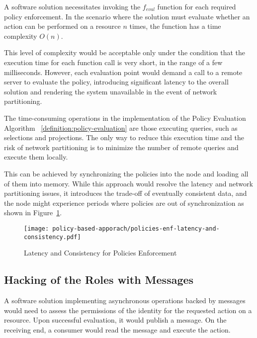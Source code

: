 A software solution necessitates invoking the $f_{eval}$ function for each required policy enforcement. 
In the scenario where the solution must evaluate whether an action can be performed on a resource $n$ times, the function has a time complexity $O(n)$.

\vspace{15pt}

This level of complexity would be acceptable only under the condition that the execution time for each function call is very short, in the range of a few milliseconds. 
However, each evaluation point would demand a call to a remote server to evaluate the policy, introducing significant latency to the overall solution and rendering the system unavailable in the event of network partitioning.


\vspace{15pt}

The time-consuming operations in the implementation of the Policy Evaluation Algorithm ~\ref{definition:policy-evaluation} are those executing queries, such as selections and projections. 
The only way to reduce this execution time and the risk of network partitioning is to minimize the number of remote queries and execute them locally. 

\vspace{15pt}

This can be achieved by synchronizing the policies into the node and loading all of them into memory. 
While this approach would resolve the latency and network partitioning issues, it introduces the trade-off of eventually consistent data, and the node might experience periods where policies are out of synchronization as shown in Figure~\ref{fig:policies-enf-latency-and-consistency}.

\begin{figure}[h]
    \centering
    \texttt{[image: policy-based-apporach/policies-enf-latency-and-consistency.pdf]}
    \caption{Latency and Consistency for Policies Enforcement}
    \label{fig:policies-enf-latency-and-consistency}
\end{figure}

\subsection{Hacking of the Roles with Messages}
\label{sec:hacking-role-messages-solution}

A software solution implementing asynchronous operations backed by messages would need to assess the permissions of the identity for the requested action on a resource. 
Upon successful evaluation, it would publish a message. On the receiving end, a consumer would read the message and execute the action.

